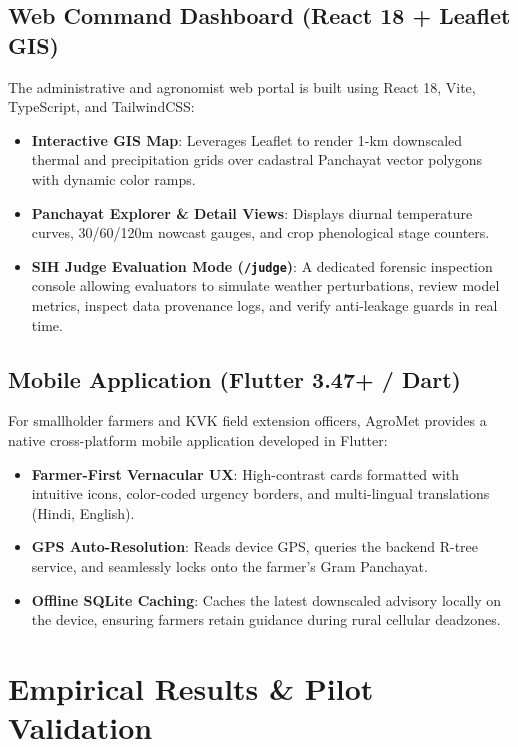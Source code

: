 \documentclass[11pt,a4paper,oneside]{report}
\begin{document}
\section{Web Command Dashboard (React 18 + Leaflet GIS)}
The administrative and agronomist web portal is built using React 18, Vite, TypeScript, and TailwindCSS:
\begin{itemize}[leftmargin=*]
    \item \textbf{Interactive GIS Map}: Leverages Leaflet to render 1-km downscaled thermal and precipitation grids over cadastral Panchayat vector polygons with dynamic color ramps.
    \item \textbf{Panchayat Explorer \& Detail Views}: Displays diurnal temperature curves, 30/60/120m nowcast gauges, and crop phenological stage counters.
    \item \textbf{SIH Judge Evaluation Mode (\texttt{/judge})}: A dedicated forensic inspection console allowing evaluators to simulate weather perturbations, review model metrics, inspect data provenance logs, and verify anti-leakage guards in real time.
\end{itemize}

\section{Mobile Application (Flutter 3.47+ / Dart)}
For smallholder farmers and KVK field extension officers, AgroMet provides a native cross-platform mobile application developed in Flutter:
\begin{itemize}[leftmargin=*]
    \item \textbf{Farmer-First Vernacular UX}: High-contrast cards formatted with intuitive icons, color-coded urgency borders, and multi-lingual translations (Hindi, English).
    \item \textbf{GPS Auto-Resolution}: Reads device GPS, queries the backend R-tree service, and seamlessly locks onto the farmer's Gram Panchayat.
    \item \textbf{Offline SQLite Caching}: Caches the latest downscaled advisory locally on the device, ensuring farmers retain guidance during rural cellular deadzones.
\end{itemize}

\chapter{Empirical Results \& Pilot Validation}
\end{document}
